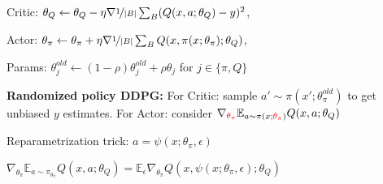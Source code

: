 \iftrue
Critic: $\theta_Q \leftarrow \theta_Q - \eta \nabla \nicefrac{1}{|B|} \sum_B (Q(x,a;\theta_Q) - y)^2$,

Actor: $\theta_\pi  \leftarrow \theta_\pi + \eta \nabla \nicefrac{1}{|B|} \sum_B Q(x, \pi(x; \theta_\pi); \theta_Q)$,

Params: $\theta_j^{old} \leftarrow (1 - \rho) \theta_j^{old} + \rho \theta_j$ for $j \in \{\pi, Q \}$
\fi


\textbf{Randomized policy DDPG:} For Critic: sample $a' \sim \pi(x'; \theta_\pi^{old})$ to get unbiased $y$ estimates. For Actor: consider $\nabla_{\textcolor{red}{\theta_\pi}} \mathbb{E}_{a \sim \pi(x; \textcolor{red}{\theta_\pi})} Q(x,a;\theta_Q)$

Reparametrization trick: $a = \psi(x; \theta_\pi, \epsilon)$

$\nabla_{\theta_\pi} \mathbb{E}_{a \sim \pi_{\theta_\pi}} Q(x,a;\theta_Q) = \mathbb{E}_\epsilon \nabla_{\theta_\pi} Q(x, \psi(x; \theta_\pi, \epsilon); \theta_Q)$

